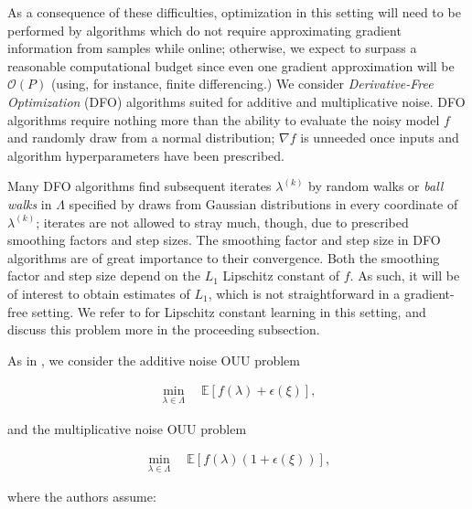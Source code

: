 \documentclass{amsart}
\begin{document}
As a consequence of these difficulties, optimization in this setting will need to be performed by algorithms which
do not require approximating gradient information from samples while online; otherwise, we expect to surpass a reasonable computational budget since even one gradient approximation will be $\mathcal{O}(P)$ (using, for instance, finite differencing.)
We consider \textit{Derivative-Free Optimization} (DFO) algorithms suited for additive and multiplicative noise. DFO algorithms require nothing more than the ability to evaluate the noisy model $f$ and randomly draw from a normal distribution; $\nabla f$ is unneeded once inputs and algorithm hyperparameters have been prescribed.

Many DFO algorithms find subsequent iterates $\lambda^{(k)}$ by random walks or \textit{ball walks} in $\Lambda$ specified by draws from Gaussian distributions in every coordinate of $\lambda^{(k)}$; iterates are not allowed to stray much, though, due to prescribed smoothing factors and step sizes. The smoothing factor and step size in DFO algorithms are of great importance to their convergence. Both the smoothing factor and step size depend on the $L_1$ Lipschitz constant of $f$. As such, it will be of interest to obtain estimates of $L_1$, which is not straightforward in a gradient-free setting. We refer to \cite{Calliess} for Lipschitz constant learning in this setting, and discuss this problem more in the proceeding subsection.

As in \cite{CW}, we consider the additive noise OUU problem

\begin{eqnarray} \label{eq:1}
\min_{\lambda \in \Lambda} \quad \mathbb{E}\left[f(\lambda)+\epsilon(\xi)\right],
\end{eqnarray} 

\noindent and the multiplicative noise OUU problem

\begin{eqnarray} \label{eq:2}
\min_{\lambda \in \Lambda} \quad \mathbb{E}\left[f(\lambda)(1+\epsilon(\xi))\right],
\end{eqnarray} 

\noindent where the authors assume:
\end{document}
